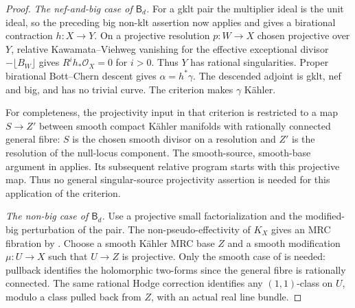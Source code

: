 \begin{proof}
\smallskip\noindent
\emph{The nef-and-big case of $\mathsf B_d$.}
For a gklt pair the multiplier ideal is the unit ideal, so the
preceding big non-klt assertion now applies and gives a birational
contraction $h:X\to Y$.
On a projective resolution $p:W\to X$ chosen projective over $Y$,
relative Kawamata--Viehweg vanishing for the effective exceptional
divisor $-\lfloor B_W\rfloor$ gives
$R^ih_*\mathcal O_X=0$ for $i>0$. Thus $Y$ has rational
singularities. Proper birational Bott--Chern descent
\cite[Lemma~8.7]{DHP2024} gives $\alpha=h^*\gamma$.
The descended adjoint is gklt, nef and big, and has no trivial
curve. The criterion \cite[Theorem~4.3]{HLX2026} makes $\gamma$
K\"ahler.

For completeness, the projectivity input in that criterion is
restricted to a map $S\to Z'$ between smooth compact K\"ahler
manifolds with rationally connected general fibre: $S$ is the
chosen smooth divisor on a resolution and $Z'$ is the resolution
of the null-locus component. The smooth-source, smooth-base
argument in \cite[Theorem~3.1, Step~1]{ClaudonHoring2024} applies. Its subsequent
relative program starts with this projective map. Thus no general singular-source projectivity assertion is needed
for this application of the criterion.

\smallskip\noindent
\emph{The non-big case of $\mathsf B_d$.}
Use a projective small factorialization and the modified-big
perturbation of the pair. The non-pseudo-effectivity of $K_X$
gives an MRC fibration by \cite{Ou2025}. Choose a smooth K\"ahler
MRC base $Z$ and a smooth modification $\mu:U\to X$ such that
$U\to Z$ is projective. Only the smooth case of
\cite[Theorem~3.1, Step~1]{ClaudonHoring2024} is needed: pullback identifies
the holomorphic two-forms since the general fibre is rationally
connected. The same rational Hodge correction identifies any
$(1,1)$-class on $U$, modulo a class pulled back from $Z$, with
an actual real line bundle.


\end{proof}
